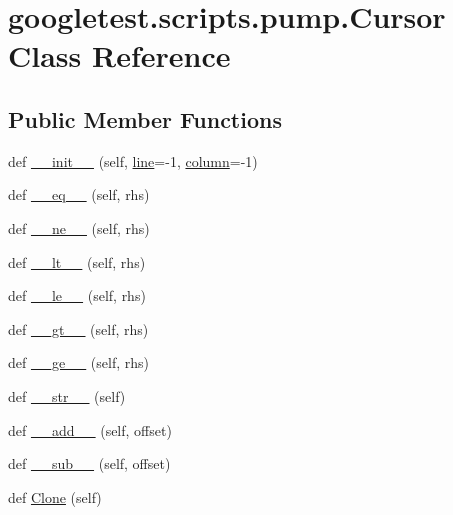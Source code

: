 \hypertarget{classgoogletest_1_1scripts_1_1pump_1_1_cursor}{}\section{googletest.\+scripts.\+pump.\+Cursor Class Reference}
\label{classgoogletest_1_1scripts_1_1pump_1_1_cursor}
\subsection*{Public Member Functions}
\begin{DoxyCompactItemize}
\item 
def \mbox{\hyperlink{classgoogletest_1_1scripts_1_1pump_1_1_cursor_a861445c418144ddc5a18a18d92f58b54}{\+\_\+\+\_\+init\+\_\+\+\_\+}} (self, \mbox{\hyperlink{classgoogletest_1_1scripts_1_1pump_1_1_cursor_ac5ea3e3272777d4798d4a3d6a963181b}{line}}=-\/1, \mbox{\hyperlink{classgoogletest_1_1scripts_1_1pump_1_1_cursor_ab54c274e7622e7a9a88adb63219be144}{column}}=-\/1)
\item 
def \mbox{\hyperlink{classgoogletest_1_1scripts_1_1pump_1_1_cursor_a48a4d1707a748957b65b3c4dca7b4466}{\+\_\+\+\_\+eq\+\_\+\+\_\+}} (self, rhs)
\item 
def \mbox{\hyperlink{classgoogletest_1_1scripts_1_1pump_1_1_cursor_a904548edd18d9d05a5a44fbb2afaf038}{\+\_\+\+\_\+ne\+\_\+\+\_\+}} (self, rhs)
\item 
def \mbox{\hyperlink{classgoogletest_1_1scripts_1_1pump_1_1_cursor_ab5f51cfc26ed93badd0f32f1a3362217}{\+\_\+\+\_\+lt\+\_\+\+\_\+}} (self, rhs)
\item 
def \mbox{\hyperlink{classgoogletest_1_1scripts_1_1pump_1_1_cursor_aa5c3322b3ac3f52ad23c39c2fa3384b3}{\+\_\+\+\_\+le\+\_\+\+\_\+}} (self, rhs)
\item 
def \mbox{\hyperlink{classgoogletest_1_1scripts_1_1pump_1_1_cursor_a24b6c0f7eae4c323b93611bceba5efec}{\+\_\+\+\_\+gt\+\_\+\+\_\+}} (self, rhs)
\item 
def \mbox{\hyperlink{classgoogletest_1_1scripts_1_1pump_1_1_cursor_a64dde679bdf10283eb32237a887e68cb}{\+\_\+\+\_\+ge\+\_\+\+\_\+}} (self, rhs)
\item 
def \mbox{\hyperlink{classgoogletest_1_1scripts_1_1pump_1_1_cursor_a37fe45e211138d656201e580bdc45574}{\+\_\+\+\_\+str\+\_\+\+\_\+}} (self)
\item 
def \mbox{\hyperlink{classgoogletest_1_1scripts_1_1pump_1_1_cursor_a3161620cbb21055fc6943f7d50eca92e}{\+\_\+\+\_\+add\+\_\+\+\_\+}} (self, offset)
\item 
def \mbox{\hyperlink{classgoogletest_1_1scripts_1_1pump_1_1_cursor_a04448d4bd2f49fff05a8031ba940369c}{\+\_\+\+\_\+sub\+\_\+\+\_\+}} (self, offset)
\item 
def \mbox{\hyperlink{classgoogletest_1_1scripts_1_1pump_1_1_cursor_a0f3e1b022e139ceaa68dc772e2520e2a}{Clone}} (self)
\end{DoxyCompactItemize}
